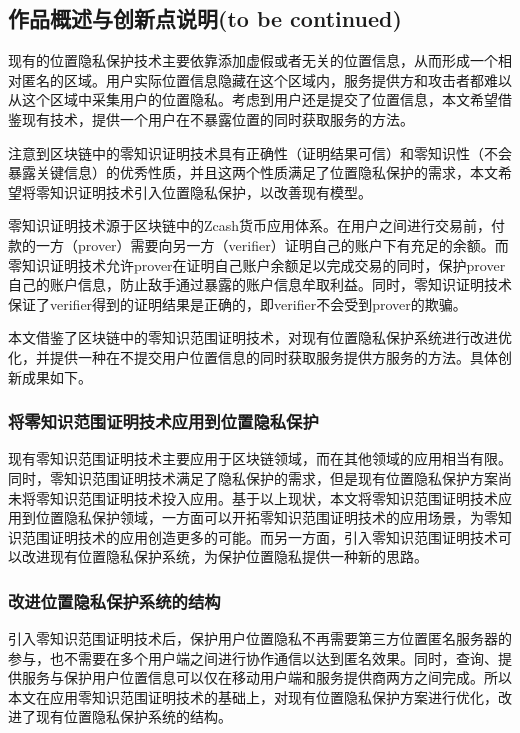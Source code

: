 \documentclass[zihao=-4]{ctexart}
\begin{document}
\subsection{作品概述与创新点说明(to be continued)}
现有的位置隐私保护技术主要依靠添加虚假或者无关的位置信息，从而形成一个相对匿名的区域。用户实际位置信息隐藏在这个区域内，服务提供方和攻击者都难以从这个区域中采集用户的位置隐私。考虑到用户还是提交了位置信息，本文希望借鉴现有技术，提供一个用户在不暴露位置的同时获取服务的方法。
\par 
注意到区块链中的零知识证明技术具有正确性（证明结果可信）和零知识性（不会暴露关键信息）的优秀性质，并且这两个性质满足了位置隐私保护的需求，本文希望将零知识证明技术引入位置隐私保护，以改善现有模型。
\par 
零知识证明技术源于区块链中的Zcash货币应用体系。在用户之间进行交易前，付款的一方（prover）需要向另一方（verifier）证明自己的账户下有充足的余额。而零知识证明技术允许prover在证明自己账户余额足以完成交易的同时，保护prover自己的账户信息，防止敌手通过暴露的账户信息牟取利益。同时，零知识证明技术保证了verifier得到的证明结果是正确的，即verifier不会受到prover的欺骗。
\par 
本文借鉴了区块链中的零知识范围证明技术，对现有位置隐私保护系统进行改进优化，并提供一种在不提交用户位置信息的同时获取服务提供方服务的方法。具体创新成果如下。

\subsubsection{将零知识范围证明技术应用到位置隐私保护}
现有零知识范围证明技术主要应用于区块链领域，而在其他领域的应用相当有限。同时，零知识范围证明技术满足了隐私保护的需求，但是现有位置隐私保护方案尚未将零知识范围证明技术投入应用。基于以上现状，本文将零知识范围证明技术应用到位置隐私保护领域，一方面可以开拓零知识范围证明技术的应用场景，为零知识范围证明技术的应用创造更多的可能。而另一方面，引入零知识范围证明技术可以改进现有位置隐私保护系统，为保护位置隐私提供一种新的思路。

\subsubsection{改进位置隐私保护系统的结构}
引入零知识范围证明技术后，保护用户位置隐私不再需要第三方位置匿名服务器的参与，也不需要在多个用户端之间进行协作通信以达到匿名效果。同时，查询、提供服务与保护用户位置信息可以仅在移动用户端和服务提供商两方之间完成。所以本文在应用零知识范围证明技术的基础上，对现有位置隐私保护方案进行优化，改进了现有位置隐私保护系统的结构。
\end{document}
